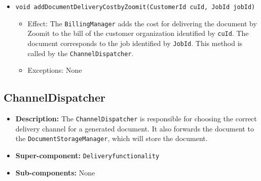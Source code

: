 \documentclass[a4paper,10pt]{article}
\begin{document}
\begin{itemize}
\begin{itemize}
		\item \texttt{void addDocumentDeliveryCostbyZoomit(CustomerId cuId, JobId jobId)}       
        \begin{itemize}
            \item Effect: The \texttt{BillingManager} adds the cost for delivering the document by Zoomit to the bill of the customer organization identified by \texttt{cuId}. The document corresponds to the job identified by \texttt{JobId}. This method is called by the \texttt{ChannelDispatcher}.
            \item Exceptions: None
        \end{itemize}                
    \end{itemize}
\end{itemize}

\subsection{ChannelDispatcher}
\begin{itemize}
    \item \textbf{Description:} The \texttt{ChannelDispatcher} is responsible for choosing the correct delivery channel for a generated document. It also forwards the document to the \texttt{DocumentStorageManager}, which will store the document.
    \item \textbf{Super-component:} \texttt{Deliveryfunctionality}
    \item \textbf{Sub-components:} None
\end{itemize}
\end{document}

